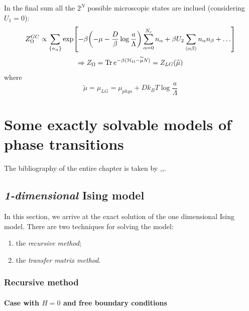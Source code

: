 \documentclass[../main/main.tex]{subfiles}
\begin{document}
\begin{remark}
In the final sum all the \( 2^N \) possible microscopic states are inclued (considering \( U_1 =0 \)):
\begin{equation}
  Z_ \Omega ^{GC} \propto  \sum_{\{ n_ \alpha  \}} \exp [-\beta \qty(-\mu - \frac{D}{\beta } \log{\frac{a}{\Lambda }} ) \sum_{\alpha =0}^{N_c} n_ \alpha  + \beta U_2 \sum_{\expval{\alpha \beta } }^{} n_ \alpha n_ \beta + \dots     ]
\end{equation}
\begin{equation}
  \Rightarrow Z_ \Omega = \Tr e^{-\beta ( \mathcal{H}_ \Omega - \widetilde{\mu} N )} = Z_{LG} ( \widetilde{\mu } )
\end{equation}
where
\begin{equation}
  \widetilde{\mu } = \mu _{LG} = \mu _{phys} + D k_B T \log{\frac{a}{\Lambda }}
\end{equation}
\end{remark}




\chapter{Some exactly solvable models of phase transitions}

The bibliography of the entire chapter is taken by \cite{9_lesson_1},\cite{9_lesson_2},\cite{9_lesson_3}.


\section{\emph{1-dimensional} Ising model}
In this section, we arrive at the exact solution of the one dimensional Ising model.
 There are two techniques for solving the model:
\begin{enumerate}
\item the \emph{recursive method};
\item the \emph{transfer matrix method}.
\end{enumerate}

\subsection{Recursive method}

\subsubsection{Case with \( H=0 \) and free boundary conditions}
\end{document}
